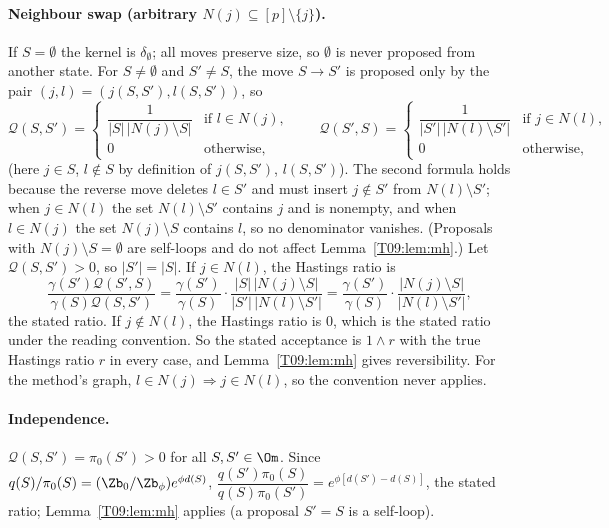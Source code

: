 \documentclass[11pt]{report}
\begin{document}
\paragraph{Neighbour swap (arbitrary $N(j)\subseteq[p]\setminus\{j\}$).} If $S=\emptyset$ the kernel is $\delta_\emptyset$; all moves preserve size, so $\emptyset$ is never proposed from another state. For $S\ne\emptyset$ and $S'\ne S$, the move $S\to S'$ is proposed only by the pair $(j,l)=(j(S,S'),l(S,S'))$, so
\[\mathcal Q(S,S')=\begin{cases}\dfrac{1}{|S|\,|N(j)\setminus S|}&\text{if } l\in N(j),\\[1ex] 0&\text{otherwise,}\end{cases}\qquad
\mathcal Q(S',S)=\begin{cases}\dfrac{1}{|S'|\,|N(l)\setminus S'|}&\text{if } j\in N(l),\\[1ex] 0&\text{otherwise,}\end{cases}\]
(here $j\in S$, $l\notin S$ by definition of $j(S,S')$, $l(S,S')$). The second formula holds because the reverse move deletes $l\in S'$ and must insert $j\notin S'$ from $N(l)\setminus S'$; when $j\in N(l)$ the set $N(l)\setminus S'$ contains $j$ and is nonempty, and when $l\in N(j)$ the set $N(j)\setminus S$ contains $l$, so no denominator vanishes. (Proposals with $N(j)\setminus S=\emptyset$ are self-loops and do not affect Lemma~\ref{T09:lem:mh}.) Let $\mathcal Q(S,S')>0$, so $|S'|=|S|$. If $j\in N(l)$, the Hastings ratio is
\[\frac{\gamma(S')\mathcal Q(S',S)}{\gamma(S)\mathcal Q(S,S')}=\frac{\gamma(S')}{\gamma(S)}\cdot\frac{|S|\,|N(j)\setminus S|}{|S'|\,|N(l)\setminus S'|}=\frac{\gamma(S')}{\gamma(S)}\cdot\frac{|N(j)\setminus S|}{|N(l)\setminus S'|},\]
the stated ratio. If $j\notin N(l)$, the Hastings ratio is $0$, which is the stated ratio under the reading convention. So the stated acceptance is $1\wedge r$ with the true Hastings ratio $r$ in every case, and Lemma~\ref{T09:lem:mh} gives reversibility. For the method's graph, $l\in N(j)\Rightarrow j\in N(l)$, so the convention never applies.

\paragraph{Independence.} $\mathcal Q(S,S')=\pi_0(S')>0$ for all $S,S'\in\Om$. Since $q(S)/\pi_0(S)=(\Zb_0/\Zb_\phi)e^{\phi d(S)}$,
$\dfrac{q(S')\pi_0(S)}{q(S)\pi_0(S')}=e^{\phi[d(S')-d(S)]}$, the stated ratio; Lemma~\ref{T09:lem:mh} applies (a proposal $S'=S$ is a self-loop).
\end{document}
